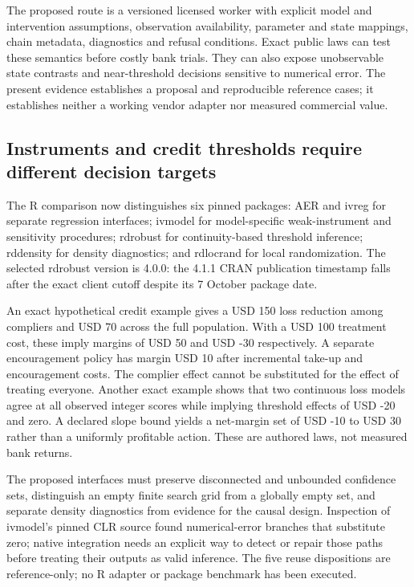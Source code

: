 The proposed route is a versioned licensed worker with explicit model
and intervention assumptions, observation availability, parameter and
state mappings, chain metadata, diagnostics and refusal conditions.
Exact public laws can test these semantics before costly bank trials.
They can also expose unobservable state contrasts and near-threshold
decisions sensitive to numerical error. The present evidence establishes
a proposal and reproducible reference cases; it establishes neither a
working vendor adapter nor measured commercial value.
\citep{exec22_state_reference}

\hypertarget{instruments-and-credit-thresholds-require-different-decision-targets}{%
\subsection{Instruments and credit thresholds require different decision
targets}\label{instruments-and-credit-thresholds-require-different-decision-targets}}

The R comparison now distinguishes six pinned packages: AER and ivreg
for separate regression interfaces; ivmodel for model-specific
weak-instrument and sensitivity procedures; rdrobust for
continuity-based threshold inference; rddensity for density diagnostics;
and rdlocrand for local randomization. The selected rdrobust version is
4.0.0: the 4.1.1 CRAN publication timestamp falls after the exact client
cutoff despite its 7 October package date.
\citep{exec22_riv_aer,exec22_riv_ivreg,exec22_riv_ivmodel,exec22_riv_rdrobust,exec22_riv_rddensity,exec22_riv_rdlocrand}

An exact hypothetical credit example gives a USD 150 loss reduction
among compliers and USD 70 across the full population. With a USD 100
treatment cost, these imply margins of USD 50 and USD -30 respectively.
A separate encouragement policy has margin USD 10 after incremental
take-up and encouragement costs. The complier effect cannot be
substituted for the effect of treating everyone. Another exact example
shows that two continuous loss models agree at all observed integer
scores while implying threshold effects of USD -20 and zero. A declared
slope bound yields a net-margin set of USD -10 to USD 30 rather than a
uniformly profitable action. These are authored laws, not measured bank
returns. \citep{exec22_riv_reference}

The proposed interfaces must preserve disconnected and unbounded
confidence sets, distinguish an empty finite search grid from a globally
empty set, and separate density diagnostics from evidence for the causal
design. Inspection of ivmodel's pinned CLR source found numerical-error
branches that substitute zero; native integration needs an explicit way
to detect or repair those paths before treating their outputs as valid
inference. The five reuse dispositions are reference-only; no R adapter
or package benchmark has been executed.
\citep{exec22_riv_ivmodel,exec22_riv_reference}

